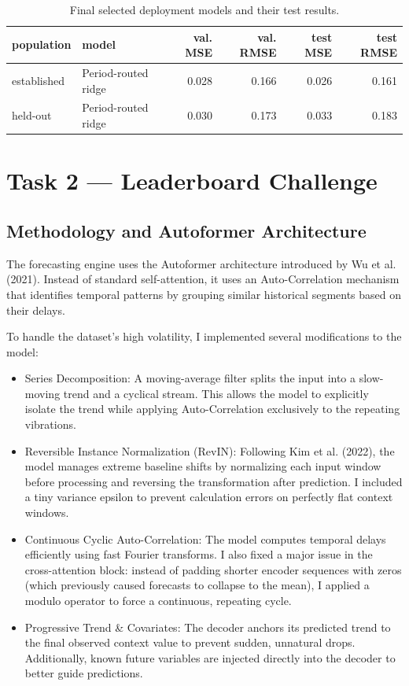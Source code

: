 \documentclass[11pt, a4paper]{article}
\begin{document}
\begin{table}[H]
\centering
\begin{tabular}{llrrrr}
\toprule
population & model & val. MSE & val. RMSE & test MSE & test RMSE \\
\midrule
established & Period-routed ridge & 0.028 & 0.166 & 0.026 & 0.161 \\
held-out & Period-routed ridge & 0.030 & 0.173 & 0.033 & 0.183 \\
\bottomrule
\end{tabular}
\caption{Final selected deployment models and their test results.}
\end{table}

\section*{Task 2 --- Leaderboard Challenge}

\subsection*{Methodology and Autoformer Architecture}

The forecasting engine uses the Autoformer architecture introduced by Wu et al. (2021). Instead of standard self-attention, it uses an Auto-Correlation mechanism that identifies temporal patterns by grouping similar historical segments based on their delays.

To handle the dataset's high volatility, I implemented several modifications to the model:

\begin{itemize}
  \item Series Decomposition: A moving-average filter splits the input into a slow-moving trend and a cyclical stream. This allows the model to explicitly isolate the trend while applying Auto-Correlation exclusively to the repeating vibrations.
  \item Reversible Instance Normalization (RevIN): Following Kim et al. (2022), the model manages extreme baseline shifts by normalizing each input window before processing and reversing the transformation after prediction. I included a tiny variance epsilon to prevent calculation errors on perfectly flat context windows.
  \item Continuous Cyclic Auto-Correlation: The model computes temporal delays efficiently using fast Fourier transforms. I also fixed a major issue in the cross-attention block: instead of padding shorter encoder sequences with zeros (which previously caused forecasts to collapse to the mean), I applied a modulo operator to force a continuous, repeating cycle.
  \item Progressive Trend \& Covariates: The decoder anchors its predicted trend to the final observed context value to prevent sudden, unnatural drops. Additionally, known future variables are injected directly into the decoder to better guide predictions.
\end{itemize}
\end{document}
